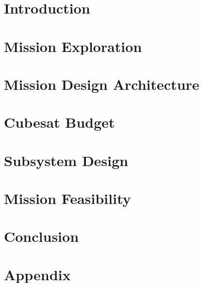 \documentclass{report}
\begin{document}
\newpage
\hypersetup{hidelinks}
% 
\pagestyle{fancy}
\fancyhf{}
\fancyfoot[CE,CO]{\thepage}
\renewcommand{\headrulewidth}{.8pt}
\renewcommand{\footrulewidth}{.8pt}
% 
\begingroup
\hypersetup{linkcolor=black}
\tableofcontents
\newpage
{}
\section{Introduction}\label{s:es}
    
\section{Mission Exploration}\label{s:ms}
    
\section{Mission Design Architecture}\label{s:cda}
    
\section{Cubesat Budget}\label{s:pd}
    
\section{Subsystem Design}\label{s:ss}
    
\section{Mission Feasibility}\label{s:mf}
    

\section{Conclusion}\label{s:tp}
    
    \newpage
\section{Appendix}\label{s:ap}
    

\endgroup
\printbibliography
\end{document}
